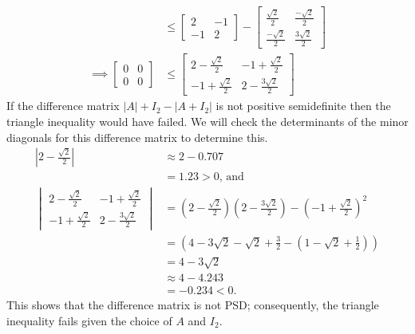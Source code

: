 \begin{example}
\begin{align*}
    &\leq
    \begin{bmatrix}
        2 &-1\\
        -1 & 2
    \end{bmatrix} 
    -
    \begin{bmatrix}
        \frac{\sqrt{2}}{2} & \frac{-\sqrt{2}}{2} \\
        \frac{-\sqrt{2}}{2} & \frac{3\sqrt{2}}{2}
    \end{bmatrix}\\
    \implies
    \begin{bmatrix}
        0 & 0 \\
        0 & 0
    \end{bmatrix}
    &\leq
    \begin{bmatrix}
        2 - \frac{\sqrt{2}}{2} & -1 + \frac{\sqrt{2}}{2}\\
        -1 + \frac{\sqrt{2}}{2} & 2 - \frac{3\sqrt{2}}{2}
    \end{bmatrix} 
\end{align*}
If the difference matrix $|A|+I_2-|A+I_2|$ is not positive semidefinite then the triangle inequality would have failed.
We will check the determinants of the minor diagonals for this difference matrix to determine this.
\begin{align*}
    \left|2-\frac{\sqrt{2}}{2}\right| &\approx 2 - 0.707 \\
    & = 1.23 > 0
    \text{, and}\\
    \begin{vmatrix}
         2 - \frac{\sqrt{2}}{2} & -1 + \frac{\sqrt{2}}{2}\\
        -1 + \frac{\sqrt{2}}{2} & 2 - \frac{3\sqrt{2}}{2}
    \end{vmatrix}
    &= \left( 2 - \frac{\sqrt{2}}{2}\right)\left(2 - \frac{3\sqrt{2}}{2}\right) - \left(-1 + \frac{\sqrt{2}}{2}\right)^2\\
    &= \left(4 - 3\sqrt{2} - \sqrt{2} + \frac{3}{2} - \left(1 - \sqrt{2} + \frac{1}{2}\right)\right)\\
    &= 4 - 3\sqrt{2}\\
    &\approx 4 - 4.243\\
    &= -0.234 < 0.
\end{align*}
This shows that the difference matrix is not PSD; consequently, the triangle inequality fails given the choice of $A$ and $I_2$.
\end{example}